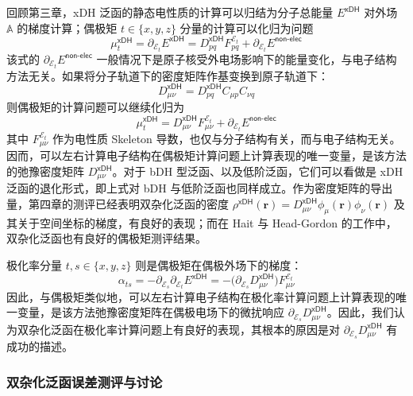 回顾第三章，xDH 泛函的静态电性质的计算可以归结为分子总能量 $E^\textsf{xDH}$ 对外场 $\mathbb{A}$ 的梯度计算；偶极矩 $t \in \{ x, y, z \}$ 分量的计算可以化归为问题
\begin{equation*}
    \mu_t^\textsf{xDH} = \partial_{\mathcal{E}_t} E^\textsf{xDH} = D_{pq}^\textsf{xDH} F_{pq}^{\mathcal{E}_t} + \partial_{\mathcal{E}_t} E^\textsf{non-elec}
\end{equation*}
该式的 $\partial_{\mathcal{E}_t} E^\textsf{non-elec}$ 一般情况下是原子核受外电场影响下的能量变化，与电子结构方法无关。如果将分子轨道下的密度矩阵作基变换到原子轨道下：
\begin{equation*}
    D_{\mu \nu}^\textsf{xDH} = D_{pq}^\textsf{xDH} C_{\mu p} C_{\nu q}
\end{equation*}
则偶极矩的计算问题可以继续化归为
\begin{equation}
    \mu_t^\textsf{xDH} = D_{\mu \nu}^\textsf{xDH} F_{\mu \nu}^{\mathcal{E}_t} + \partial_{\mathcal{E}_t} E^\textsf{non-elec}
\end{equation}
其中 $F_{\mu \nu}^{\mathcal{E}_t}$ 作为电性质 Skeleton 导数，也仅与分子结构有关，而与电子结构无关。因而，可以左右计算电子结构在偶极矩计算问题上计算表现的唯一变量，是该方法的弛豫密度矩阵 $D_{\mu \nu}^\textsf{xDH}$。对于 bDH 型泛函、以及低阶泛函，它们可以看做是 xDH 泛函的退化形式，即上式对 bDH 与低阶泛函也同样成立。作为密度矩阵的导出量，第四章的测评已经表明双杂化泛函的密度 $\rho^\textsf{xDH} (\bm{r}) = D_{\mu \nu}^\textsf{xDH} \phi_\mu (\bm{r}) \phi_\nu (\bm{r})$ 及其关于空间坐标的梯度，有良好的表现；而在 Hait 与 Head-Gordon 的工作\cite{Hait-Head-Gordon.JCTC.2018}中，双杂化泛函也有良好的偶极矩测评结果。

极化率分量 $t, s \in \{ x, y, z \}$ 则是偶极矩在偶极外场下的梯度：
\begin{equation*}
    \alpha_{ts} = - \partial_{\mathcal{E}_s} \partial_{\mathcal{E}_t} E^\textsf{xDH} = - \big( \partial_{\mathcal{E}_s} D_{\mu \nu}^\textsf{xDH} \big) F_{\mu \nu}^{\mathcal{E}_t}
\end{equation*}
因此，与偶极矩类似地，可以左右计算电子结构在极化率计算问题上计算表现的唯一变量，是该方法弛豫密度矩阵在偶极电场下的微扰响应 $\partial_{\mathcal{E}_s} D_{\mu \nu}^\textsf{xDH}$。因此，我们认为双杂化泛函在极化率计算问题上有良好的表现，其根本的原因是对 $\partial_{\mathcal{E}_s} D_{\mu \nu}^\textsf{xDH}$ 有成功的描述。

\subsubsection{双杂化泛函误差测评与讨论}

